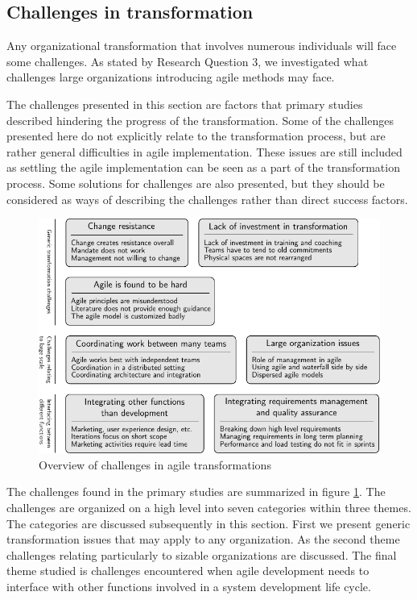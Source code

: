 \documentclass[preprint,authoryear,12pt]{elsarticle}
\begin{document}
\clearpage

\subsection{Challenges in transformation}

Any organizational transformation that involves numerous individuals will face
some challenges. As stated by Research Question 3, we investigated what
challenges large organizations introducing agile methods may face.

The challenges presented in this section are factors that primary studies
described hindering the progress of the transformation. Some of the challenges
presented here do not explicitly relate to the transformation process, but are
rather general difficulties in agile implementation. These issues are still
included as settling the agile implementation can be seen as a part of the
transformation process. Some solutions for challenges are also presented, but
they should be considered as ways of describing the challenges rather than
direct success factors.

\begin{figure}[!b]
  \begin{center}
    \includegraphics{graphics/challenges_summary.pdf}
    \caption{Overview of challenges in agile transformations}
    \label{fig:challenges_summary}
  \end{center}
\end{figure}

The challenges found in the primary studies are summarized in figure
\ref{fig:challenges_summary}. The challenges are organized on a high level into
seven categories within three themes. The categories are discussed subsequently
in this section. First we present generic transformation issues that may apply
to any organization. As the second theme challenges relating particularly to
sizable organizations are discussed. The final theme studied is challenges
encountered when agile development needs to interface with other functions
involved in a system development life cycle.
\end{document}
